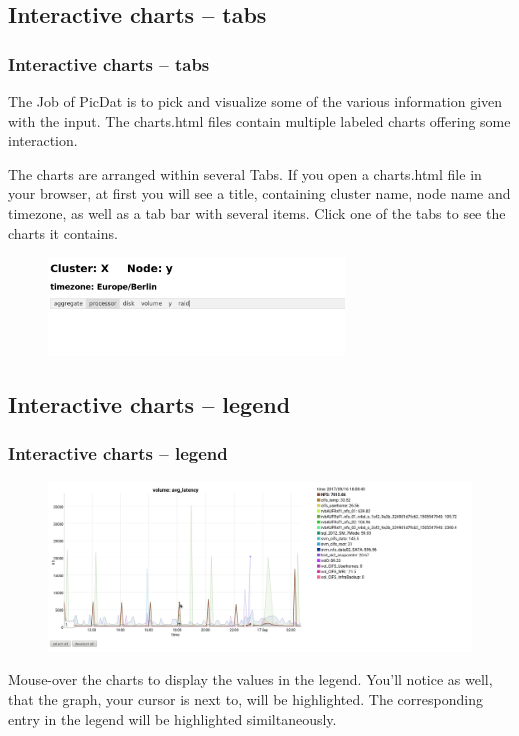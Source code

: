 \documentclass[8pt]{beamer}
\begin{document}
\subsection{Interactive charts -- tabs}
\begin{frame}
\frametitle{Interactive charts -- tabs}
The Job of PicDat is to pick and visualize some of the various information given with the input. The charts.html files contain multiple labeled charts offering some interaction.
\bigskip

The charts are arranged within several Tabs. If you open a charts.html file in your browser, at first you will see a title, containing cluster name, node name and timezone, as well as a tab bar with several items. Click one of the tabs to see the charts it contains.
\bigskip

\begin{figure}
        \includegraphics[width=0.7\textwidth, left]{../images/PicDat_tabs.png}
\end{figure}
\end{frame}

\subsection{Interactive charts -- legend}
\begin{frame}
\frametitle{Interactive charts -- legend}
\begin{figure}
	\includegraphics[width=\textwidth]{../images/PicDat_highlight2.png}
\end{figure}

Mouse-over the charts to display the values in the legend. You'll notice as well, that the graph, your cursor is next to, will be highlighted. The corresponding entry in the legend will be highlighted similtaneously.
\end{frame}
\end{document}
